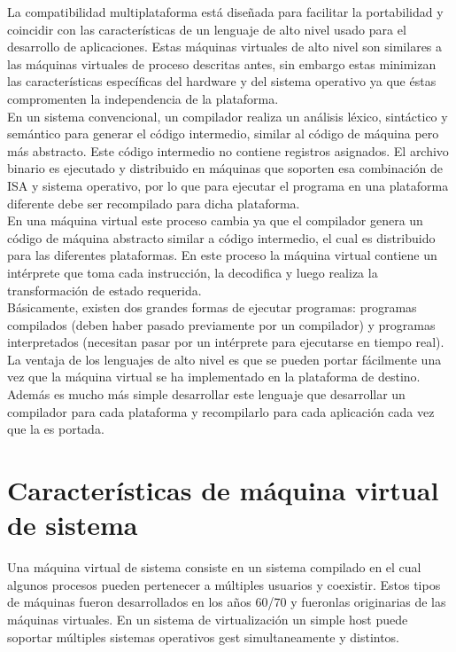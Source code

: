 \documentclass[10pt,a4paper,spanish]{report}
\begin{document}
  \noindent
  La compatibilidad multiplataforma está diseñada para facilitar la portabilidad y coincidir con las características de un lenguaje de alto nivel usado para el desarrollo de aplicaciones. Estas máquinas virtuales de alto nivel son similares a las máquinas virtuales de proceso descritas antes, sin embargo estas minimizan las características específicas del hardware y del sistema operativo ya que éstas compromenten la independencia de la plataforma. \\

  \noindent
  En un sistema convencional, un compilador realiza un análisis léxico, sintáctico y semántico para generar el código intermedio, similar al código de máquina pero más abstracto. Este código intermedio no contiene registros asignados. El archivo binario es ejecutado y distribuido en máquinas que soporten esa combinación de ISA y sistema operativo, por lo que para ejecutar el programa en una plataforma diferente debe ser recompilado para dicha plataforma. \\

  \noindent
  En una máquina virtual este proceso cambia ya que el compilador genera un código de máquina abstracto similar a código intermedio, el cual es distribuido para las diferentes plataformas. En este proceso la máquina virtual contiene un intérprete que toma cada instrucción, la decodifica y luego realiza la transformación de estado requerida.\\

  \noindent
  Básicamente, existen dos grandes formas de ejecutar programas: programas compilados (deben haber pasado previamente por un compilador) y programas interpretados (necesitan pasar por un intérprete para ejecutarse en tiempo real). \\

  \noindent
  La ventaja de los lenguajes de alto nivel es que se pueden portar fácilmente una vez que la máquina virtual se ha implementado en la plataforma de destino. Además es mucho más simple desarrollar este lenguaje que desarrollar un compilador para cada plataforma y recompilarlo para cada aplicación cada vez que la es portada.

  \newpage
  \section{Características de máquina virtual de sistema}

  \noindent
  Una máquina virtual de sistema consiste en un sistema compilado en el cual algunos procesos pueden pertenecer a múltiples usuarios y coexistir. Estos tipos de máquinas fueron desarrollados en los años 60/70 y fueronlas originarias de las máquinas virtuales. En un sistema de virtualización un simple host puede soportar múltiples sistemas operativos gest simultaneamente y distintos. \\
\end{document}
